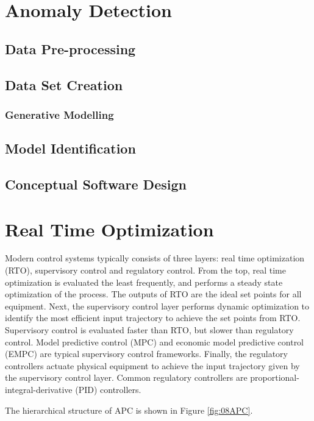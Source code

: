 \section{Anomaly Detection}
\subsection{Data Pre-processing}
\subsection{Data Set Creation}
\subsubsection{Generative Modelling}
\subsection{Model Identification}
\subsection{Conceptual Software Design}

\section{Real Time Optimization}
Modern control systems typically consists of three layers: real time optimization (RTO), supervisory control and regulatory control.  From the top, real time optimization is evaluated the least frequently, and performs a steady state optimization of the process.  The outputs of RTO are the ideal set points for all equipment.  Next, the supervisory control layer performs dynamic optimization to identify the most efficient input trajectory to achieve the set points from RTO. Supervisory control is evaluated faster than RTO, but slower than regulatory control. Model predictive control (MPC) and economic model predictive control (EMPC) are typical supervisory control frameworks. Finally, the regulatory controllers actuate physical equipment to achieve the input trajectory given by the supervisory control layer.  Common regulatory controllers are proportional-integral-derivative (PID) controllers.

The hierarchical structure of APC is shown in Figure \ref{fig:08APC}.

